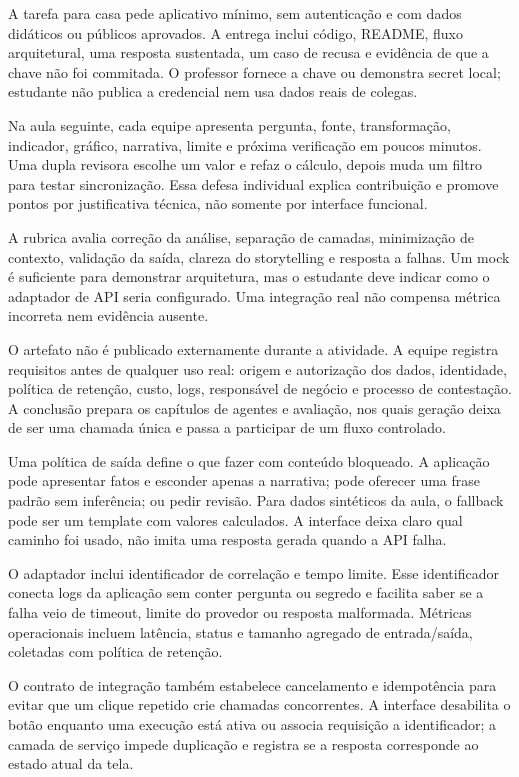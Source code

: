 A tarefa para casa pede aplicativo mínimo, sem autenticação e com dados didáticos ou públicos aprovados. A entrega inclui código, README, fluxo arquitetural, uma resposta sustentada, um caso de recusa e evidência de que a chave não foi commitada. O professor fornece a chave ou demonstra secret local; estudante não publica a credencial nem usa dados reais de colegas.

Na aula seguinte, cada equipe apresenta pergunta, fonte, transformação, indicador, gráfico, narrativa, limite e próxima verificação em poucos minutos. Uma dupla revisora escolhe um valor e refaz o cálculo, depois muda um filtro para testar sincronização. Essa defesa individual explica contribuição e promove pontos por justificativa técnica, não somente por interface funcional.

A rubrica avalia correção da análise, separação de camadas, minimização de contexto, validação da saída, clareza do storytelling e resposta a falhas. Um mock é suficiente para demonstrar arquitetura, mas o estudante deve indicar como o adaptador de API seria configurado. Uma integração real não compensa métrica incorreta nem evidência ausente.

O artefato não é publicado externamente durante a atividade. A equipe registra requisitos antes de qualquer uso real: origem e autorização dos dados, identidade, política de retenção, custo, logs, responsável de negócio e processo de contestação. A conclusão prepara os capítulos de agentes e avaliação, nos quais geração deixa de ser uma chamada única e passa a participar de um fluxo controlado.

Uma política de saída define o que fazer com conteúdo bloqueado. A aplicação pode apresentar fatos e esconder apenas a narrativa; pode oferecer uma frase padrão sem inferência; ou pedir revisão. Para dados sintéticos da aula, o fallback pode ser um template com valores calculados. A interface deixa claro qual caminho foi usado, não imita uma resposta gerada quando a API falha.

O adaptador inclui identificador de correlação e tempo limite. Esse identificador conecta logs da aplicação sem conter pergunta ou segredo e facilita saber se a falha veio de timeout, limite do provedor ou resposta malformada. Métricas operacionais incluem latência, status e tamanho agregado de entrada/saída, coletadas com política de retenção.

O contrato de integração também estabelece cancelamento e idempotência para evitar que um clique repetido crie chamadas concorrentes. A interface desabilita o botão enquanto uma execução está ativa ou associa requisição a identificador; a camada de serviço impede duplicação e registra se a resposta corresponde ao estado atual da tela.

